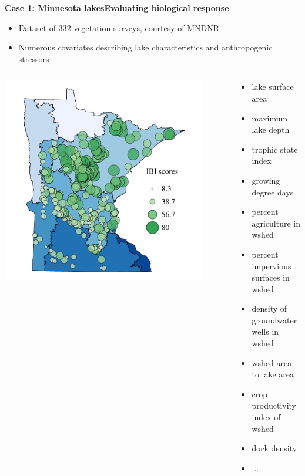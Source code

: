 \documentclass[serif]{beamer}\usepackage[]{graphicx}\usepackage[]{color}
\begin{document}
\begin{frame}{\textbf{Case 1: Minnesota lakes}}{\textbf{Evaluating biological response}}
\begin{itemize}
\item Dataset of 332 vegetation surveys, courtesy of MNDNR \cite{Beck14a}
\item Numerous covariates describing lake characteristics and anthropogenic stressors
\end{itemize}
\begin{columns}
\begin{column}{0.5\textwidth}
\centerline{\includegraphics[width=0.9\textwidth]{fig/Beck_GEDsem-ibi_data.pdf}}
\end{column}
\begin{column}{0.5\textwidth}
\scriptsize
\begin{itemize}
\item{lake surface area}
\item{maximum lake depth}
\item{trophic state index}
\item{growing degree days}
\item{percent agriculture in wshed}
\item{percent impervious surfaces in wshed}
\item{density of groundwater wells in wshed}
\item{wshed area to lake area}
\item{crop productivity index of wshed}
\item{dock density}
\item{...}
\end{itemize}
\end{column}
\end{columns}
\end{frame}
\end{document}
